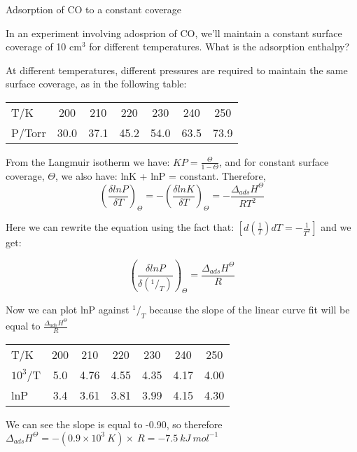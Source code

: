 \documentclass[ignorenonframetext]{beamer}
\begin{document}
\begin{example}{Adsorption of CO to a constant coverage}

In an experiment involving adosprion of CO, we'll maintain a constant surface coverage of 10 cm\(^3\) for different temperatures. What is the adsorption enthalpy?

At different temperatures, different pressures are required to maintain the same surface coverage, as in the following table:

\begin{tabular}{lcccccc}
T/K & 200 & 210 & 220 & 230 & 240 & 250\\
P/Torr & 30.0 & 37.1 & 45.2 & 54.0 & 63.5 & 73.9\\
\end{tabular}

From the Langmuir isotherm we have: \(KP = \frac{\Theta}{1-\Theta}\), and for constant surface coverage, \(\Theta\), we also  have: lnK + lnP = constant. Therefore,
\[\left(\frac{\delta lnP}{\delta T}\right)_\Theta = -\left(\frac{\delta lnK}{\delta T}\right)_\Theta = - \frac{\Delta_{ads}H^\Theta}{RT^2}\]

Here we can rewrite the equation using the fact that: \(\left[d\left(\frac{1}{T}\right)dT = -\frac{1}{T^2}\right]\) and we get:

\[\left(\frac{\delta lnP}{\delta (^1/_T)}\right)_\Theta = \frac{\Delta_{ads}H^\Theta}{R}\]

Now we can plot lnP against \(^1/_T\) because the slope of the linear curve fit will be equal to \(\frac{\Delta_{ads}H^\Theta}{R}\)

\begin{tabular}{lcccccc}
T/K & 200 & 210 & 220 & 230 & 240 & 250\\
\(10^3\)/T & 5.0 & 4.76 & 4.55 & 4.35 & 4.17 & 4.00\\
lnP & 3.4 & 3.61 & 3.81 & 3.99 & 4.15 & 4.30\\
\end{tabular}


We can see the slope is equal to -0.90, so therefore \(\Delta_{ads}H^\Theta = -(0.9\times10^3\ K)\times\ R = -7.5\ kJ\ mol^{-1}\)

\end{example}
\end{document}
